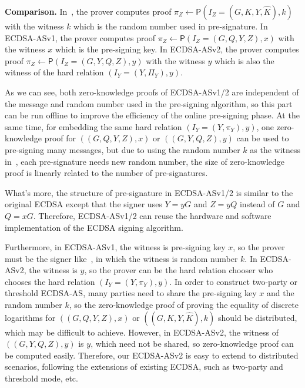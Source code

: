 \documentclass{llncs}
\begin{document}
\begin{trivlist}
\item \textbf{Comparison.} In~\cite{AumayrEEFHMMR20}, the prover computes proof $\pi_Z\leftarrow \mathsf{P}(I_Z=(G,K,Y,\hat{K}),k)$ with the witness $k$ which is the random number used in pre-signature.
In ECDSA-ASv1, the prover computes proof $\pi_Z\leftarrow \mathsf{P}(I_Z=(G,Q,Y,Z),x)$ with the witness $x$ which is the pre-signing key. 
In ECDSA-ASv2, the prover computes proof $\pi_Z\leftarrow \mathsf{P}(I_Z=(G,Y,Q,Z),y)$ with the witness $y$ which is also the witness of the hard relation $(I_Y=(Y,\Pi_Y),y)$.

As we can see, both zero-knowledge proofs of ECDSA-ASv1/2 are independent of the message and random number used in the pre-signing algorithm, so this part can be run offline to improve the efficiency of the online pre-signing phase. At the same time, for embedding the same hard relation $(I_Y = (Y, \pi_Y), y)$, one zero-knowledge proof for $((G, Q, Y, Z), x)$ or $((G, Y, Q, Z), y)$ can be used to pre-signing many messages, but due to using the random number $k$ as the witness in~\cite{AumayrEEFHMMR20}, each pre-signature needs new random number, the size of zero-knowledge proof is linearly related to the number of pre-signatures.

What's more, the structure of pre-signature in ECDSA-ASv1/2 is similar to the original ECDSA except that the signer uses $Y=yG$ and $Z=yQ$ instead of $G$ and $Q=xG$. Therefore, ECDSA-ASv1/2 can reuse the hardware and software implementation of the ECDSA signing algorithm. 

Furthermore, in ECDSA-ASv1, the witness is pre-signing key $x$, so the prover must be the signer like~\cite{AumayrEEFHMMR20}, in which the witness is random number $k$. In ECDSA-ASv2, the witness is $y$, so the prover can be the hard relation chooser who chooses the hard relation $(I_Y=(Y,\pi_Y),y)$. In order to construct two-party or threshold ECDSA-AS, many parties need to share the pre-signing key $x$ and the random number $k$, so the zero-knowledge proof of proving the equality of discrete logarithms for $((G, Q, Y, Z), x)$ or $((G, K, Y, \hat{K}), k)$ should be distributed, which may be difficult to achieve. However, in ECDSA-ASv2, the witness of $((G, Y, Q, Z),y)$ is $y$, which need not be shared, so zero-knowledge proof can be computed easily. Therefore, our ECDSA-ASv2 is easy to extend to distributed scenarios, following the extensions of existing ECDSA, such as two-party and threshold mode, etc. 
\end{trivlist}
\end{document}
